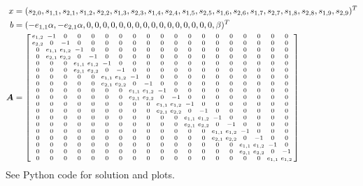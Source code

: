 \documentclass{article} %
\begin{document}
\begin{align*}
x &= (s_{2,0}, s_{1,1}, s_{2,1}, s_{1,2}, s_{2,2}, s_{1,3}, s_{2,3}, s_{1,4}, s_{2,4}, s_{1,5}, s_{2,5}, s_{1,6}, s_{2,6}, s_{1,7}, s_{2,7}, s_{1,8}, s_{2,8}, s_{1,9}, s_{2,9})^T \\
b &= (-e_{1,1} \alpha, -e_{2,1} \alpha, 0, 0, 0, 0, 0, 0, 0, 0, 0, 0, 0, 0, 0, 0, 0, 0, \beta)^T \\
\boldsymbol{A} &=
  \begin{bsmallmatrix}
	e_{1,2} & -1 & 0 & 0 & 0 & 0 & 0 & 0 & 0 & 0 & 0 & 0 & 0 & 0 & 0 & 0 & 0 & 0 & 0 \\
	e_{2,2} & 0 & -1 & 0 & 0 & 0 & 0 & 0 & 0 & 0 & 0 & 0 & 0 & 0 & 0 & 0 & 0 & 0 & 0 \\ 
	0 & e_{1,1} & e_{1,2} & -1 & 0 & 0 & 0 & 0 & 0 & 0 & 0 & 0 & 0 & 0 & 0 & 0 & 0 & 0 & 0 \\ 
	0 & e_{2,1} & e_{2,2} & 0 & -1 & 0 & 0 & 0 & 0 & 0 & 0 & 0 & 0 & 0 & 0 & 0 & 0 & 0 & 0 \\ 
	0 & 0 & 0 & e_{1,1} & e_{1,2} & -1 & 0 & 0 & 0 & 0 & 0 & 0 & 0 & 0 & 0 & 0 & 0 & 0 & 0 \\ 
	0 & 0 & 0 & e_{2,1} & e_{2,2} & 0 & -1 & 0 & 0 & 0 & 0 & 0 & 0 & 0 & 0 & 0 & 0 & 0 & 0 \\
	0 & 0 & 0 & 0 & 0 & e_{1,1} & e_{1,2} & -1 & 0 & 0 & 0 & 0 & 0 & 0 & 0 & 0 & 0 & 0 & 0 \\ 
	0 & 0 & 0 & 0 & 0 & e_{2,1} & e_{2,2} & 0 & -1 & 0 & 0 & 0 & 0 & 0 & 0 & 0 & 0 & 0 & 0 \\
	0 & 0 & 0 & 0 & 0 & 0 & 0 & e_{1,1} & e_{1,2} & -1 & 0 & 0 & 0 & 0 & 0 & 0 & 0 & 0 & 0 \\ 
	0 & 0 & 0 & 0 & 0 & 0 & 0 & e_{2,1} & e_{2,2} & 0 & -1 & 0 & 0 & 0 & 0 & 0 & 0 & 0 & 0 \\
	0 & 0 & 0 & 0 & 0 & 0 & 0 & 0 & 0 & e_{1,1} & e_{1,2} & -1 & 0 & 0 & 0 & 0 & 0 & 0 & 0 \\ 
	0 & 0 & 0 & 0 & 0 & 0 & 0 & 0 & 0 & e_{2,1} & e_{2,2} & 0 & -1 & 0 & 0 & 0 & 0 & 0 & 0 \\
	0 & 0 & 0 & 0 & 0 & 0 & 0 & 0 & 0 & 0 & 0 & e_{1,1} & e_{1,2} & -1 & 0 & 0 & 0 & 0 & 0 \\ 
	0 & 0 & 0 & 0 & 0 & 0 & 0 & 0 & 0 & 0 & 0 & e_{2,1} & e_{2,2} & 0 & -1 & 0 & 0 & 0 & 0 \\
	0 & 0 & 0 & 0 & 0 & 0 & 0 & 0 & 0 & 0 & 0 & 0 & 0 & e_{1,1} & e_{1,2} & -1 & 0 & 0 & 0 \\ 
	0 & 0 & 0 & 0 & 0 & 0 & 0 & 0 & 0 & 0 & 0 & 0 & 0 & e_{2,1} & e_{2,2} & 0 & -1 & 0 & 0 \\
	0 & 0 & 0 & 0 & 0 & 0 & 0 & 0 & 0 & 0 & 0 & 0 & 0 & 0 & 0 & e_{1,1} & e_{1,2} & -1 & 0 \\ 
	0 & 0 & 0 & 0 & 0 & 0 & 0 & 0 & 0 & 0 & 0 & 0 & 0 & 0 & 0 & e_{2,1} & e_{2,2} & 0 & -1 \\
	0 & 0 & 0 & 0 & 0 & 0 & 0 & 0 & 0 & 0 & 0 & 0 & 0 & 0 & 0 & 0 & 0 & e_{1,1} & e_{1,2} \\
	\end{bsmallmatrix}
\end{align*}
See Python code for solution and plots. \\
\\
\end{document}
